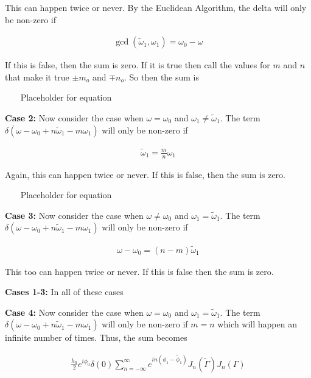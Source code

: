 \documentclass[onecolumn, groupedaddress, 10pt]{revtex4-1}
\begin{document}
This can happen twice or never.  By the Euclidean Algorithm, the delta will only be non-zero if

\begin{align}
\gcd \left( \widetilde{\omega}_1, \omega_1 \right) = \omega_0 - \omega
\end{align}

If this is false, then the sum is zero.  If it is true then call the values for $m$ and $n$ that make it true $\pm m_o$ and $\mp n_o$.  So then the sum is 


~~~ Placeholder for equation ~~~


\textbf{Case 2:}  Now consider the case when $\omega = \omega_0$ and $\omega_1 \neq \widetilde{\omega}_1$.  The term $\delta(\omega - \omega_0 + n\widetilde{\omega}_1 - m\omega_1)$ will only be non-zero if

\begin{align}
\widetilde{\omega}_1 = \frac{m}{n} \omega_1
\end{align}

Again, this can happen twice or never.  If this is false, then the sum is zero.


~~~ Placeholder for equation ~~~


\textbf{Case 3:}  Now consider the case when $\omega \neq \omega_0$ and $\omega_1 = \widetilde{\omega}_1$.  The term $\delta(\omega - \omega_0 + n\widetilde{\omega}_1 - m\omega_1)$ will only be non-zero if

\begin{align}
\omega - \omega_0 = (n-m)\widetilde{\omega}_1
\end{align}

This too can happen twice or never.  If this is false then the sum is zero.


\textbf{Cases 1-3:}  In all of these cases

\textbf{Case 4:}  Now consider the case when $\omega = \omega_0$ and $\omega_1 = \widetilde{\omega}_1$.  The term $\delta(\omega - \omega_0 + n\widetilde{\omega}_1 - m\omega_1)$ will only be non-zero if $m=n$ which will happen an infinite number of times.  Thus, the sum becomes

\begin{align}
\frac{h_0}{2} e^{i\phi_0} \delta(0) \sum_{n=-\infty}^{\infty} e^{in(\phi_1-\widetilde{\phi}_1)} J_n(\widetilde{\Gamma}) J_n (\Gamma)
\end{align}
\end{document}
